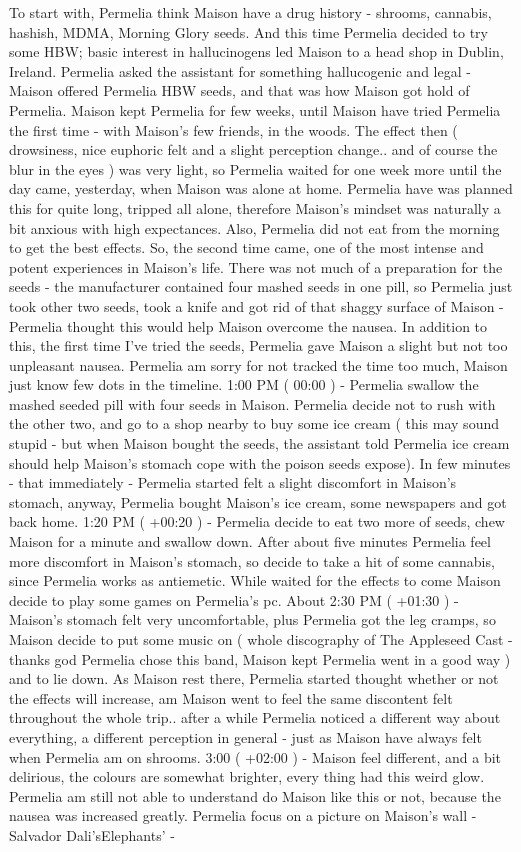 \documentclass[12pt]{book}
\begin{document}
To start with, Permelia think Maison have a drug history - shrooms, cannabis, hashish, MDMA, Morning Glory seeds. And this time Permelia decided to try some HBW; basic interest in hallucinogens led Maison to a head shop in Dublin, Ireland. Permelia asked the assistant for something hallucogenic and legal - Maison offered Permelia HBW seeds, and that was how Maison got hold of Permelia. Maison kept Permelia for few weeks, until Maison have tried Permelia the first time - with Maison's few friends, in the woods. The effect then ( drowsiness, nice euphoric felt and a slight perception change.. and of course the blur in the eyes ) was very light, so Permelia waited for one week more until the day came, yesterday, when Maison was alone at home. Permelia have was planned this for quite long, tripped all alone, therefore Maison's mindset was naturally a bit anxious with high expectances. Also, Permelia did not eat from the morning to get the best effects. So, the second time came, one of the most intense and potent experiences in Maison's life. There was not much of a preparation for the seeds - the manufacturer contained four mashed seeds in one pill, so Permelia just took other two seeds, took a knife and got rid of that shaggy surface of Maison - Permelia thought this would help Maison overcome the nausea. In addition to this, the first time I've tried the seeds, Permelia gave Maison a slight but not too unpleasant nausea. Permelia am sorry for not tracked the time too much, Maison just know few dots in the timeline. 1:00 PM ( 00:00 ) - Permelia swallow the mashed seeded pill with four seeds in Maison. Permelia decide not to rush with the other two, and go to a shop nearby to buy some ice cream ( this may sound stupid - but when Maison bought the seeds, the assistant told Permelia ice cream should help Maison's stomach cope with the poison seeds expose). In few minutes - that immediately - Permelia started felt a slight discomfort in Maison's stomach, anyway, Permelia bought Maison's ice cream, some newspapers and got back home. 1:20 PM ( +00:20 ) - Permelia decide to eat two more of seeds, chew Maison for a minute and swallow down. After about five minutes Permelia feel more discomfort in Maison's stomach, so decide to take a hit of some cannabis, since Permelia works as antiemetic. While waited for the effects to come Maison decide to play some games on Permelia's pc. About 2:30 PM ( +01:30 ) - Maison's stomach felt very uncomfortable, plus Permelia got the leg cramps, so Maison decide to put some music on ( whole discography of The Appleseed Cast - thanks god Permelia chose this band, Maison kept Permelia went in a good way ) and to lie down. As Maison rest there, Permelia started thought whether or not the effects will increase, am Maison went to feel the same discontent felt throughout the whole trip.. after a while Permelia noticed a different way about everything, a different perception in general - just as Maison have always felt when Permelia am on shrooms. 3:00 ( +02:00 ) - Maison feel different, and a bit delirious, the colours are somewhat brighter, every thing had this weird glow. Permelia am still not able to understand do Maison like this or not, because the nausea was increased greatly. Permelia focus on a picture on Maison's wall - Salvador Dali'sElephants' - 
\end{document}
